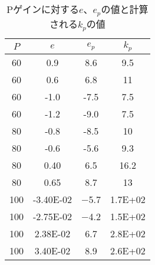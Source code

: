 \begin{table}[!ht]
	\centering
	\caption{Pゲインに対する$e$、$e_p$の値と計算される$k_p$の値}\label{tab:e-ep}
	\begin{tabular}{cccc}
		\hline
		$P$ & $e$              & $e_p$       & $k_p$           \\ \hline
		60  & 0.9              & 8.6         & 9.5             \\
		60  & 0.6              & 6.8         & 11              \\
		60  & -1.0             & -7.5        & 7.5             \\
		60  & -1.2             & -9.0        & 7.5             \\
		80  & -0.8             & -8.5        & 10              \\
		80  & -0.6             & -5.6        & 9.3             \\
		80  & 0.40             & 6.5         & 16.2            \\
		80  & 0.65             & 8.7         & 13              \\
		100 & \SI{-3.40E-02}{} & \SI{-5.7}{} & \SI{1.7E+02}{}  \\
		100 & \SI{-2.75E-02}{} & \SI{-4.2}{} & \SI{1.5E+02} {} \\
		100 & \SI{2.38E-02}{}  & \SI{6.7}{}  & \SI{2.8E+02}{}  \\
		100 & \SI{3.40E-02}{}  & \SI{ 8.9}{} & \SI{2.6E+02}{}  \\ \hline
	\end{tabular}
\end{table}
